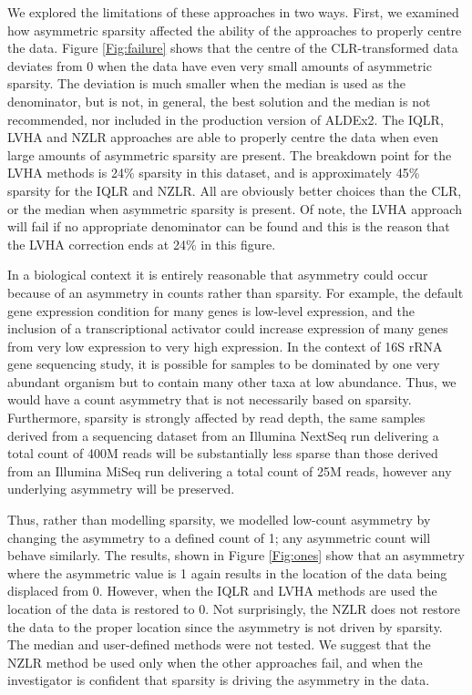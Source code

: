 \documentclass{bmcart}
\begin{document}
We  explored the limitations of these approaches in two ways. First, we examined how asymmetric  sparsity  affected the ability of the approaches to properly centre the data. Figure \ref{Fig:failure} shows that the centre of the CLR-transformed data deviates from 0 when the data have even very small amounts of asymmetric sparsity. The deviation is much smaller when the median is used as the denominator, but is not, in general, the best solution and the median is not recommended, nor included in the production version of ALDEx2. The IQLR, LVHA and NZLR approaches are able to properly centre the data when even large amounts of asymmetric sparsity are present. The breakdown point for the LVHA methods is 24\% sparsity in this dataset, and is approximately  45\% sparsity for the  IQLR and NZLR. All are obviously better choices than the CLR, or the median when asymmetric sparsity is present. Of note, the LVHA approach will fail if no appropriate denominator can be found and this is the reason that the LVHA correction ends at 24\% in this figure. 

In a biological context it is entirely reasonable that asymmetry could occur because of an asymmetry in counts  rather than sparsity. For example, the default gene expression condition for many genes is low-level expression, and the inclusion of a transcriptional activator could increase expression of many genes from very low expression to very high expression. In the context of 16S rRNA gene sequencing study, it is possible for samples to be dominated by one very abundant organism but to contain many other taxa at low abundance. Thus, we would have a count asymmetry that is not necessarily based on sparsity. Furthermore, sparsity is strongly affected by read depth, the same samples derived from a sequencing dataset from an Illumina NextSeq run delivering a total count of 400M reads will be substantially less sparse than those derived from an Illumina MiSeq run delivering a total count of 25M reads, however any underlying asymmetry will be preserved.

Thus, rather than modelling sparsity, we modelled low-count asymmetry by changing the asymmetry to a defined count of 1; any asymmetric count will behave similarly. The results, shown in Figure \ref{Fig:ones} show that an asymmetry where the asymmetric value is 1 again results in the location of the data being displaced from 0. However, when the IQLR and LVHA methods are used the location of the data is restored to 0. Not surprisingly, the NZLR does not restore the data to the proper location since the asymmetry is not driven by sparsity. The median and user-defined methods were not tested. We suggest that the NZLR method be used only when the other approaches fail, and when the investigator is confident that sparsity is driving the asymmetry in the data. 
\end{document}
